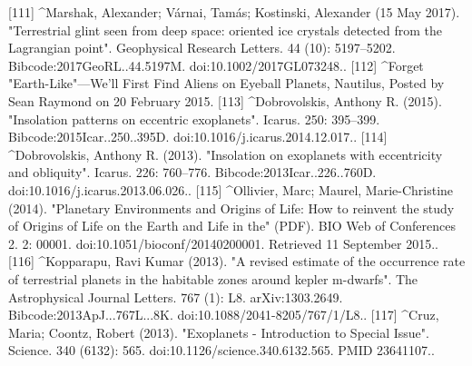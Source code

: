 [111]
^Marshak, Alexander; Várnai, Tamás; Kostinski, Alexander (15 May 2017). "Terrestrial glint seen from deep space: oriented ice crystals detected from the Lagrangian point". Geophysical Research Letters. 44 (10): 5197–5202. Bibcode:2017GeoRL..44.5197M. doi:10.1002/2017GL073248..
[112]
^Forget "Earth-Like"—We'll First Find Aliens on Eyeball Planets, Nautilus, Posted by Sean Raymond on 20 February 2015.
[113]
^Dobrovolskis, Anthony R. (2015). "Insolation patterns on eccentric exoplanets". Icarus. 250: 395–399. Bibcode:2015Icar..250..395D. doi:10.1016/j.icarus.2014.12.017..
[114]
^Dobrovolskis, Anthony R. (2013). "Insolation on exoplanets with eccentricity and obliquity". Icarus. 226: 760–776. Bibcode:2013Icar..226..760D. doi:10.1016/j.icarus.2013.06.026..
[115]
^Ollivier, Marc; Maurel, Marie-Christine (2014). "Planetary Environments and Origins of Life: How to reinvent the study of Origins of Life on the Earth and Life in the" (PDF). BIO Web of Conferences 2. 2: 00001. doi:10.1051/bioconf/20140200001. Retrieved 11 September 2015..
[116]
^Kopparapu, Ravi Kumar (2013). "A revised estimate of the occurrence rate of terrestrial planets in the habitable zones around kepler m-dwarfs". The Astrophysical Journal Letters. 767 (1): L8. arXiv:1303.2649. Bibcode:2013ApJ...767L...8K. doi:10.1088/2041-8205/767/1/L8..
[117]
^Cruz, Maria; Coontz, Robert (2013). "Exoplanets - Introduction to Special Issue". Science. 340 (6132): 565. doi:10.1126/science.340.6132.565. PMID 23641107..